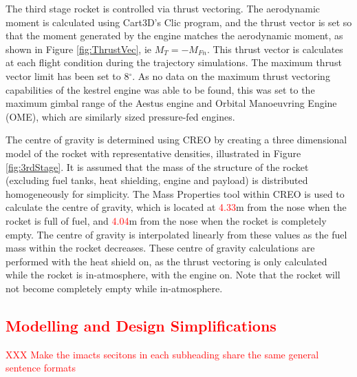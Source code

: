 		The third stage rocket is controlled via thrust vectoring. The aerodynamic moment is calculated using Cart3D's Clic program, and the thrust vector is set so that the moment generated by the engine matches the aerodynamic moment, as shown in Figure \ref{fig:ThrustVec}, ie $M_{T} = -M_{Fn}$. This thrust vector is calculates at each flight condition during the trajectory simulations. The maximum thrust vector limit has been set to 8$^\circ$. As no data on the maximum thrust vectoring capabilities of the kestrel engine was able to be found, this was set to the maximum gimbal range of the Aestus engine and Orbital Manoeuvring Engine (OME), which are similarly sized pressure-fed engines\cite{Wade2017}.
		
		The centre of gravity is determined using CREO by creating a three dimensional model of the rocket with representative densities, illustrated in Figure \ref{fig:3rdStage}. It is assumed that the mass of the structure of the rocket (excluding fuel tanks, heat shielding, engine and payload) is distributed homogeneously for simplicity. The Mass Properties tool within CREO is used to calculate the centre of gravity, which is located at \textcolor{red}{4.33}m from the nose when the rocket is full of fuel, and \textcolor{red}{4.04}m from the nose when the rocket is completely empty. The centre of gravity is interpolated linearly from these values as the fuel mass within the rocket decreases. These centre of gravity calculations are performed with the heat shield on, as the thrust vectoring is only calculated while the rocket is in-atmosphere, with the engine on. Note that the rocket will not become completely empty while in-atmosphere. 
		
	
		

\textcolor{red}{
\section{Modelling and Design Simplifications}\label{sec:simpl}  %
}

\textcolor{red}{XXX Make the imacts secitons in each subheading share the same general sentence formats}

